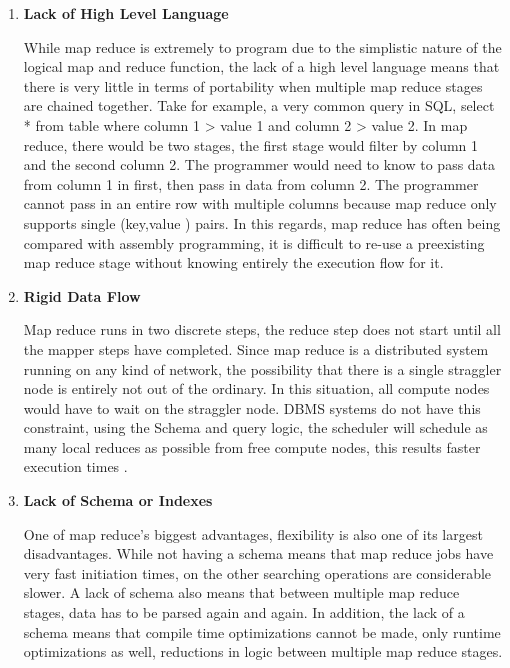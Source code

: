 \documentclass[10pt,twocolumn]{IEEEtran11}
\begin{document}
\begin {enumerate}
\setlength\itemsep{1em}
\item 

\textbf{Lack of High Level Language}

While map reduce is extremely to program due to the simplistic nature of the logical map and reduce function, the lack of a high level language means that there is very little in terms of portability when multiple map reduce stages are chained together.   Take for example, a very common query in SQL, select * from table where column 1 > value 1 and column 2 > value 2.  In map reduce, there would be two stages, the first stage
would filter by column 1 and the second column 2.  The programmer would need to know to pass data from column 1 in first, then pass in data from column 2.  The programmer cannot pass in an entire row with multiple columns because map reduce only supports single (key,value ) pairs.
In this regards, map reduce has often being compared with assembly programming, it is difficult to re-use a preexisting map reduce stage without knowing entirely the execution flow for it.  
\item 

\textbf{Rigid Data Flow}

Map reduce runs in two discrete steps, the reduce step does not start until all the mapper steps have completed.  Since map reduce is a distributed system running on any kind of network, the possibility that there is a single straggler node is entirely not out of the ordinary.  In this situation, all compute nodes would have to wait on the straggler node.  DBMS systems do not have this constraint, using the Schema and query logic, the scheduler will schedule as many local reduces as possible from free compute nodes, this results faster execution times \cite{yang2007map}.

\item 

\textbf{Lack of Schema or Indexes}

One of map reduce's biggest advantages, flexibility is also one of its largest disadvantages.  While not having a schema means that map reduce jobs have very fast initiation times,  on the other searching operations  are considerable slower.  A lack of schema also means that between multiple map reduce stages, data has to be parsed again and again.  In addition, the lack of a schema means that compile time optimizations cannot be made, only runtime optimizations as well, reductions in logic between multiple map reduce stages.

\end {enumerate}
\end{document}
